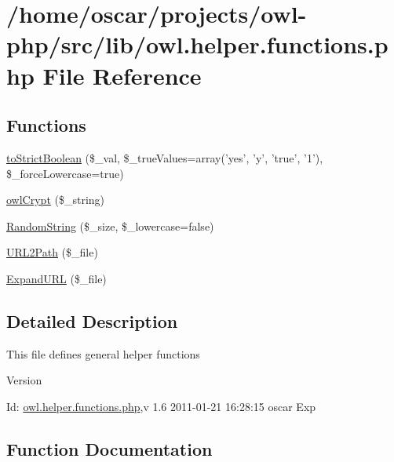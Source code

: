 \section{/home/oscar/projects/owl-\/php/src/lib/owl.helper.functions.php File Reference}
\label{owl_8helper_8functions_8php}
\subsection*{Functions}
\begin{DoxyCompactItemize}
\item 
\hyperlink{owl_8helper_8functions_8php_a2c49978306cd0e2f4f9406c20373ed02}{toStrictBoolean} (\$\_\-val, \$\_\-trueValues=array('yes', 'y', 'true', '1'), \$\_\-forceLowercase=true)
\item 
\hyperlink{owl_8helper_8functions_8php_a0836b830fe9e399265d4cf910c5dff28}{owlCrypt} (\$\_\-string)
\item 
\hyperlink{owl_8helper_8functions_8php_a91f5481c5ca87b74848c1966639d490c}{RandomString} (\$\_\-size, \$\_\-lowercase=false)
\item 
\hyperlink{owl_8helper_8functions_8php_a0eb759657249228d1a2473ffa7de921c}{URL2Path} (\$\_\-file)
\item 
\hyperlink{owl_8helper_8functions_8php_a08f49d79aaaa581551e49017424cbe77}{ExpandURL} (\$\_\-file)
\end{DoxyCompactItemize}


\subsection{Detailed Description}
This file defines general helper functions \begin{DoxyVersion}{Version}

\end{DoxyVersion}
\begin{DoxyParagraph}{Id:}
\hyperlink{owl_8helper_8functions_8php}{owl.helper.functions.php},v 1.6 2011-\/01-\/21 16:28:15 oscar Exp 
\end{DoxyParagraph}


\subsection{Function Documentation}

